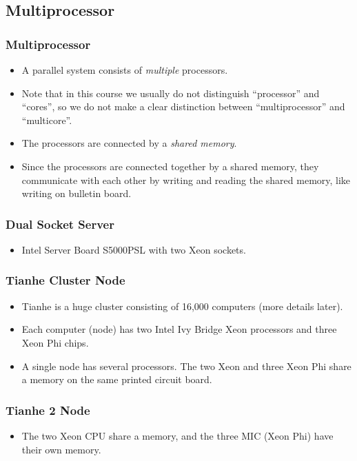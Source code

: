 \documentclass{beamer}
\begin{document}
\begin{CJK}{UTF8}{bsmi}
\subsection{Multiprocessor}

\begin{frame}
\frametitle{Multiprocessor} 
\begin{itemize}
\item A parallel system consists of {\em multiple} processors.
\item Note that in this course we usually do not distinguish
  ``processor'' and ``cores'', so we do not make a clear distinction
  between ``multiprocessor'' and ``multicore''.
\item The processors are connected by a {\em shared memory}.
\item Since the processors are connected together by a shared memory,
  they communicate with each other by writing and reading the shared
  memory, like writing on bulletin board.
\end{itemize}
\end{frame}

\begin{frame}
\frametitle{Dual Socket Server}
\begin{itemize}
\item Intel Server Board S5000PSL with two Xeon sockets.
\end{itemize}
\centerline{}
\end{frame}




\begin{frame}
\frametitle{Tianhe Cluster Node}
\begin{itemize}
\item Tianhe is a huge cluster consisting of 16,000 computers (more
  details later).  
\item Each computer (node) has two Intel Ivy Bridge Xeon processors
  and three Xeon Phi chips. 
\item A single node has several processors.  The two Xeon and three
  Xeon Phi share a memory on the same printed circuit board.
\end{itemize}
\end{frame}

\begin{frame}
\frametitle{Tianhe 2 Node}
\begin{itemize}
\item The two Xeon CPU share a memory, and the three MIC (Xeon Phi)
  have their own memory.
\end{itemize}
\centerline{}
\end{frame}


\end{CJK}
\end{document}
